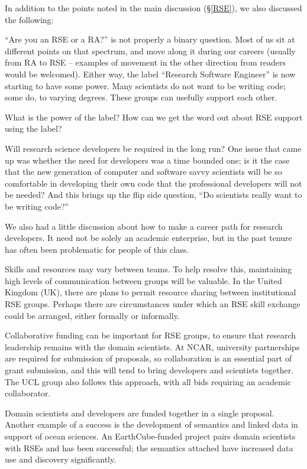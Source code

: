 In addition to the points noted in the main discussion (\S\ref{RSE}), we also
discussed the following:

``Are you an RSE or a RA?'' is not properly a binary question. Most of
us sit at different points on that spectrum, and move along it during our
careers (usually from RA to RSE -- examples of movement in the other direction
from readers would be welcomed). Either way, the label ``Research Software
Engineer'' is now starting to have some power. Many scientists do not want to be
writing code; some do, to varying degrees. These groups can usefully support
each other.

What is the power of the label? How can we get the word out about RSE support using the label?

Will research science developers be required in the long run? One issue that
came up was whether the need for developers was a time bounded one; is it the
case that the new generation of computer and software savvy scientists will be
so comfortable in developing their own code that the professional developers will
not be needed? And this brings up the flip side question, ``Do scientists really
want to be writing code?''

We also had a little discussion about how to make a career path for
research developers. It need not be solely an academic enterprise, but in the
past tenure has often been problematic for people of this class.

Skills and resources may vary between teams. To help resolve this, maintaining
high levels of communication between groups will be valuable. In the United Kingdom (UK), there
are plans to permit resource sharing between institutional RSE groups. Perhaps
there are circumstances under which an RSE skill exchange could be arranged,
either formally or informally.

Collaborative funding can be important for RSE groups, to ensure that research
leadership remains with the domain scientists. At NCAR, university partnerships
are required for submission of proposals, so collaboration is an essential part
of grant submission, and this will tend to bring developers and scientists
together. The UCL group also follows this approach, with all bids requiring an
academic collaborator.

Domain scientists and developers are funded together in a single proposal.
Another example of a success is the development of semantics and linked data in
support of ocean sciences. An EarthCube-funded project pairs domain scientists
with RSEs and has been successful; the semantics attached have increased data
use and discovery significantly.

